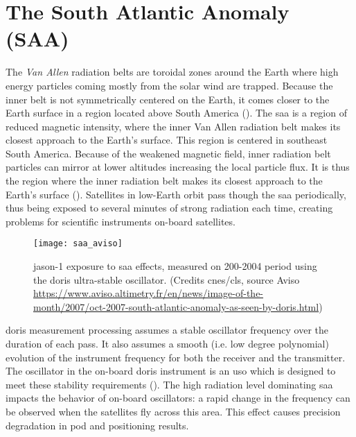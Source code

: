 \section{The South Atlantic Anomaly (SAA)}\label{sec:saa}

\iffalse
https://www.aviso.altimetry.fr/en/news/image-of-the-month/2007/oct-2007-south-atlantic-anomaly-as-seen-by-doris.html
https://ids-doris.org/images/documents/report/ids_workshop_2010/IDS10_s1_Stepanek_Spot5SAA.pdf
\fi

The \emph{Van Allen} radiation belts 
are toroidal zones around the Earth where high energy particles coming mostly 
from the solar wind are trapped. Because the inner belt is not symmetrically 
centered on the Earth, it comes closer to the Earth surface in a region 
located above South America (\cite{Jalabert2018}).
The \gls{saa} is a region of reduced magnetic intensity, where 
the inner Van Allen radiation belt makes its closest approach 
to the Earth's surface. This region is centered in southeast South America. Because 
of the weakened magnetic 
field, inner radiation belt particles can mirror at lower altitudes increasing 
the local particle flux. It is thus the region where the inner radiation belt 
makes its closest approach to the Earth's surface (\cite{Anderson2018}). 
Satellites in low-Earth orbit pass though the \gls{saa} periodically, thus being 
exposed to several minutes of strong radiation each time, creating problems for 
scientific instruments on-board satellites.

\begin{figure}
  \centering
  \texttt{[image: saa\_aviso]}
  \caption{\gls{jason}-1 exposure to \gls{saa} effects, measured on 200-2004 
    period using the \gls{doris} ultra-stable oscillator. (Credits \gls{cnes}/\gls{cls}, 
    source Aviso \url{https://www.aviso.altimetry.fr/en/news/image-of-the-month/2007/oct-2007-south-atlantic-anomaly-as-seen-by-doris.html})}
  \label{fig:saa-aviso}
\end{figure}

\gls{doris} measurement processing assumes a stable oscillator frequency over 
the duration of each pass. It also assumes a smooth (i.e. low degree polynomial) 
evolution of the instrument frequency for both the receiver and the transmitter. 
The oscillator in the on-board \gls{doris} instrument is an \gls{uso} which is 
designed to meet these stability requirements (\cite{Jalabert2018}).
The high radiation level dominating \gls{saa} impacts the behavior of on-board 
oscillators: a rapid change in the frequency can be observed when the satellites 
fly across this area. This effect causes precision degradation in \gls{pod} and 
positioning results.

